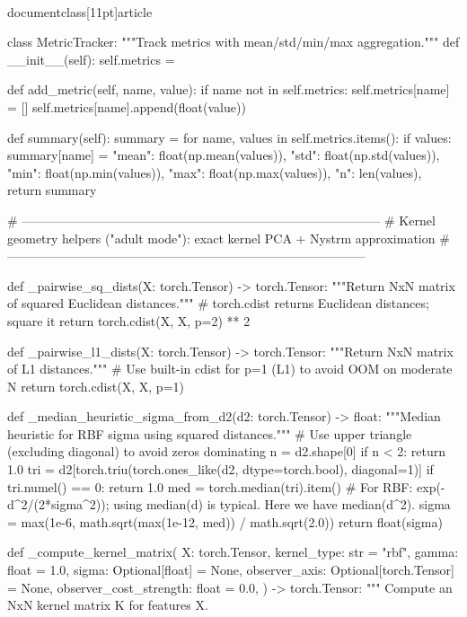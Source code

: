\\documentclass[11pt]{article}
\begin{document}
\begin{CodeBlock}
class MetricTracker:
    """Track metrics with mean/std/min/max aggregation."""
    def __init__(self):
        self.metrics = {}

    def add_metric(self, name, value):
        if name not in self.metrics:
            self.metrics[name] = []
        self.metrics[name].append(float(value))

    def summary(self):
        summary = {}
        for name, values in self.metrics.items():
            if values:
                summary[name] = {
                    "mean": float(np.mean(values)),
                    "std": float(np.std(values)),
                    "min": float(np.min(values)),
                    "max": float(np.max(values)),
                    "n": len(values),
                }
        return summary



# --------------------------------------------------------------------------------------
# Kernel geometry helpers ("adult mode"): exact kernel PCA + Nystrm approximation
# --------------------------------------------------------------------------------------

def _pairwise_sq_dists(X: torch.Tensor) -> torch.Tensor:
    """Return NxN matrix of squared Euclidean distances."""
    # torch.cdist returns Euclidean distances; square it
    return torch.cdist(X, X, p=2) ** 2


def _pairwise_l1_dists(X: torch.Tensor) -> torch.Tensor:
    """Return NxN matrix of L1 distances."""
    # Use built-in cdist for p=1 (L1) to avoid OOM on moderate N
    return torch.cdist(X, X, p=1)


def _median_heuristic_sigma_from_d2(d2: torch.Tensor) -> float:
    """Median heuristic for RBF sigma using squared distances."""
    # Use upper triangle (excluding diagonal) to avoid zeros dominating
    n = d2.shape[0]
    if n < 2:
        return 1.0
    tri = d2[torch.triu(torch.ones_like(d2, dtype=torch.bool), diagonal=1)]
    if tri.numel() == 0:
        return 1.0
    med = torch.median(tri).item()
    # For RBF: exp(-d^2/(2*sigma^2)); using median(d) is typical. Here we have median(d^2).
    sigma = max(1e-6, math.sqrt(max(1e-12, med)) / math.sqrt(2.0))
    return float(sigma)


def _compute_kernel_matrix(
    X: torch.Tensor,
    kernel_type: str = "rbf",
    gamma: float = 1.0,
    sigma: Optional[float] = None,
    observer_axis: Optional[torch.Tensor] = None,
    observer_cost_strength: float = 0.0,
) -> torch.Tensor:
    """
    Compute an NxN kernel matrix K for features X.
    

\end{CodeBlock}
\end{document}
